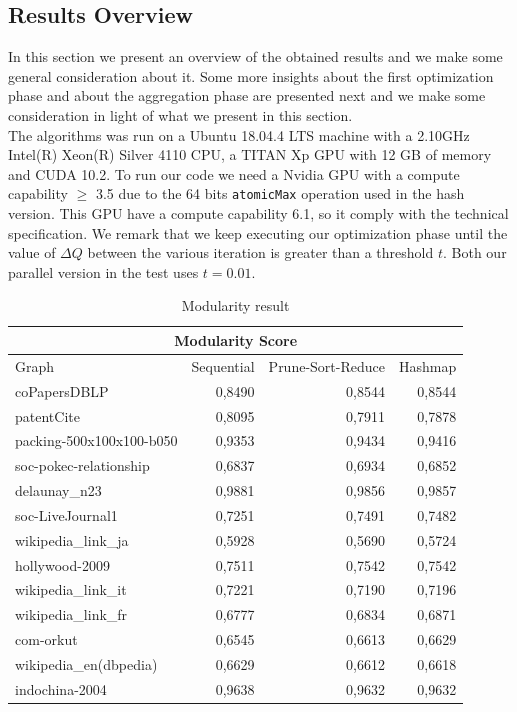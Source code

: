 \subsection{Results Overview}
In this section we present an overview of the obtained results and we make some general consideration about it. Some more insights about the first optimization phase and about the aggregation phase are presented next and we make some consideration in light of what we present in this section.\\ 
The algorithms was run on a Ubuntu 18.04.4 LTS machine with a 2.10GHz  Intel(R) Xeon(R) Silver 4110 CPU, a TITAN Xp GPU with 12 GB of memory and CUDA 10.2. To run our code we need a Nvidia GPU with a compute capability $\geq$ 3.5 due to the 64 bits \verb|atomicMax| operation used in the hash version. This GPU have a compute capability 6.1, so it comply with the technical specification.
We remark that we keep executing our optimization phase until the value of $\Delta Q$ between the various iteration is greater than a threshold $t$. Both our parallel version in the test uses $t = 0.01$.\\
\begin{table}[h]
	\centering
	\begin{tabular}{ |l||r||r|r|}
		\hline
		\multicolumn{4}{|c|}{Modularity Score} \\
		\hline
		Graph & Sequential & Prune-Sort-Reduce & Hashmap \\
		\hline
		coPapersDBLP 			& 0,8490 & 0,8544 & 0,8544 \\
		patentCite 				& 0,8095 & 0,7911 & 0,7878 \\
		packing-500x100x100-b050& 0,9353 & 0,9434 & 0,9416 \\
		soc-pokec-relationship	& 0,6837 & 0,6934 & 0,6852 \\ 
		delaunay\_n23 			& 0,9881 & 0,9856 & 0,9857 \\
		soc-LiveJournal1 		& 0,7251 & 0,7491 & 0,7482 \\
		wikipedia\_link\_ja 	& 0,5928 & 0,5690 & 0,5724 \\
		hollywood-2009 			& 0,7511 & 0,7542 & 0,7542 \\
		wikipedia\_link\_it 	& 0,7221 & 0,7190 & 0,7196 \\
		wikipedia\_link\_fr 	& 0,6777 & 0,6834 & 0,6871 \\
		com-orkut 				& 0,6545 & 0,6613 & 0,6629 \\
		wikipedia\_en(dbpedia) 	& 0,6629 & 0,6612 & 0,6618 \\
		indochina-2004 			& 0,9638 & 0,9632 & 0,9632 \\
		\hline
	\end{tabular}
	\caption{\label{tab:mod}Modularity result}
\end{table} \\
